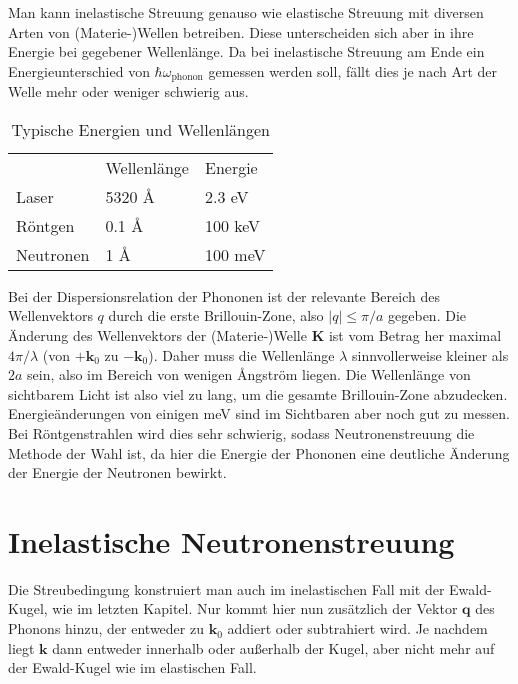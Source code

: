 Man kann inelastische Streuung genauso wie elastische Streuung mit diversen Arten von (Materie-)Wellen betreiben. Diese unterscheiden sich aber in ihre Energie bei gegebener Wellenlänge. Da bei inelastische Streuung am Ende ein Energieunterschied von $\hbar
 \omega_\text{phonon} $ gemessen werden soll, fällt dies je nach Art der Welle mehr oder weniger schwierig aus.
 
 \begin{table}
 \begin{tabular}{lll}
          & Wellenlänge & Energie \\
   Laser & 5320 \AA & 2.3 eV \\
   Röntgen & 0.1 \AA & 100 keV \\
   Neutronen & 1 \AA & 100 meV \\
 \end{tabular}
 \caption{Typische Energien und Wellenlängen}
 \end{table}

Bei der Dispersionsrelation der Phononen ist der relevante Bereich des Wellenvektors $q$ durch die erste Brillouin-Zone, also $| q | \le \pi / a$ gegeben.  Die Änderung des Wellenvektors der (Materie-)Welle $\mathbf{K}$ ist vom Betrag her maximal $4 \pi / \lambda$ (von $+\mathbf{k}_0$ zu $-\mathbf{k}_0$). Daher muss die Wellenlänge $\lambda$ sinnvollerweise kleiner als $2a$ sein, also im Bereich von wenigen Ångström liegen.
 Die Wellenlänge von sichtbarem Licht ist also viel zu lang, um die gesamte Brillouin-Zone abzudecken. Energieänderungen  von einigen meV sind im Sichtbaren aber noch gut zu messen. Bei Röntgenstrahlen wird dies sehr schwierig, sodass Neutronenstreuung die Methode der Wahl ist, da hier die Energie der Phononen eine deutliche Änderung der Energie der Neutronen bewirkt.




\section{Inelastische Neutronenstreuung}


Die Streubedingung konstruiert man auch im inelastischen Fall mit der Ewald-Kugel, wie im letzten Kapitel. Nur kommt hier nun zusätzlich der Vektor $\mathbf{q}$ des Phonons hinzu, der entweder zu $\mathbf{k}_0$ addiert oder subtrahiert wird. Je nachdem liegt $\mathbf{k}$ dann entweder innerhalb oder außerhalb der Kugel, aber nicht mehr auf der Ewald-Kugel wie im elastischen Fall.


